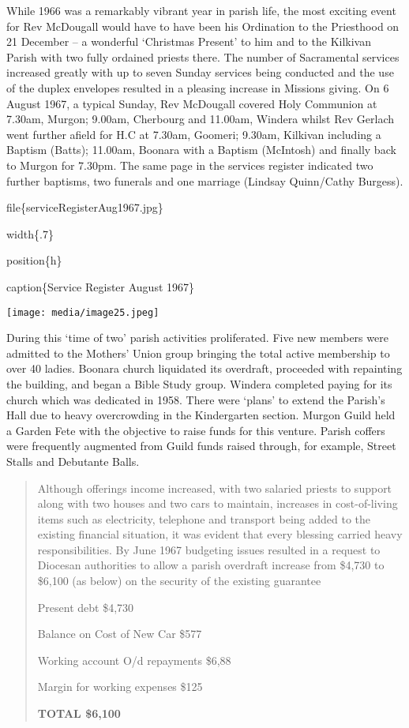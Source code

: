 While 1966 was a remarkably vibrant year in parish life, the most
exciting event for Rev McDougall would have to have been his Ordination
to the Priesthood on 21 December -- a wonderful `Christmas Present' to
him and to the Kilkivan Parish with two fully ordained priests there.
The number of Sacramental services increased greatly with up to seven
Sunday services being conducted and the use of the duplex envelopes
resulted in a pleasing increase in Missions giving. On 6 August 1967, a
typical Sunday, Rev McDougall covered Holy Communion at 7.30am, Murgon;
9.00am, Cherbourg and 11.00am, Windera whilst Rev Gerlach went further
afield for H.C at 7.30am, Goomeri; 9.30am, Kilkivan including a Baptism
(Batts); 11.00am, Boonara with a Baptism (McIntosh) and finally back to
Murgon for 7.30pm. The same page in the services register indicated two
further baptisms, two funerals and one marriage (Lindsay Quinn/Cathy
Burgess).

file\{serviceRegisterAug1967.jpg\}

width\{.7\}

position\{h\}

caption\{Service Register August 1967\}

\texttt{[image: media/image25.jpeg]}

During this `time of two' parish activities proliferated. Five new
members were admitted to the Mothers' Union group bringing the total
active membership to over 40 ladies. Boonara church liquidated its
overdraft, proceeded with repainting the building, and began a Bible
Study group. Windera completed paying for its church which was dedicated
in 1958. There were `plans' to extend the Parish's Hall due to heavy
overcrowding in the Kindergarten section. Murgon Guild held a Garden
Fete with the objective to raise funds for this venture. Parish coffers
were frequently augmented from Guild funds raised through, for example,
Street Stalls and Debutante Balls.

\begin{quote}
Although offerings income increased, with two salaried priests to
support along with two houses and two cars to maintain, increases in
cost-of-living items such as electricity, telephone and transport being
added to the existing financial situation, it was evident that every
blessing carried heavy responsibilities. By June 1967 budgeting issues
resulted in a request to Diocesan authorities to allow a parish
overdraft increase from \$4,730 to \$6,100 (as below) on the security of
the existing guarantee

Present debt \$4,730

Balance on Cost of New Car \$577

Working account O/d repayments \$6,88

Margin for working expenses \$125

\textbf{TOTAL \$6,100}
\end{quote}

